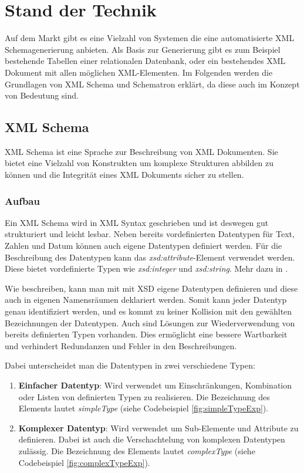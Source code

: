\chapter{Stand der Technik}
\label{cha:technikstand}
Auf dem Markt gibt es eine Vielzahl von Systemen die eine automatisierte XML Schemagenerierung anbieten.
Als Basis zur Generierung gibt es zum Beispiel bestehende Tabellen einer relationalen Datenbank, oder ein bestehendes XML Dokument mit allen möglichen XML-Elementen. Im Folgenden werden die Grundlagen von XML Schema und Schematron erklärt, da diese auch im Konzept von Bedeutung sind.

\section{XML Schema}
\label{cha:Schema}
XML Schema ist eine Sprache zur Beschreibung von XML Dokumenten. Sie bietet eine Vielzahl von Konstrukten um komplexe Strukturen abbilden zu können und die Integrität eines XML Dokuments sicher zu stellen.

\subsection{Aufbau}
Ein XML Schema wird in XML Syntax geschrieben und ist deswegen gut strukturiert und leicht lesbar.
Neben bereits vordefinierten Datentypen für Text, Zahlen und Datum können auch eigene Datentypen definiert werden. Für die Beschreibung des Datentypen kann das \emph{xsd:attribute}-Element verwendet werden. Diese bietet vordefinierte Typen wie \emph{xsd:integer} und \emph{xsd:string}. Mehr dazu in \textcite{Wheeler2011}.

Wie \textcite{Madhavan2001} beschreiben, kann man mit mit XSD eigene Datentypen definieren und diese auch in eigenen Namensräumen deklariert werden. Somit kann jeder Datentyp genau identifiziert werden, und es kommt zu keiner Kollision mit den gewählten Bezeichnungen der Datentypen.
Auch sind Lösungen zur Wiederverwendung von bereits definierten Typen vorhanden. Dies ermöglicht eine bessere Wartbarkeit und verhindert Redundanzen und Fehler in den Beschreibungen.

Dabei unterscheidet man die Datentypen in zwei verschiedene Typen:

\begin{enumerate}
\item \textbf{Einfacher Datentyp}: Wird verwendet um Einschränkungen, Kombination oder Listen von definierten Typen zu realisieren. Die Bezeichnung des Elements lautet \emph{simpleType} (siehe Codebeispiel \ref{fig:simpleTypeExp}).
\item \textbf{Komplexer Datentyp}: Wird verwendet um Sub-Elemente und Attribute zu definieren. Dabei ist auch die Verschachtelung von komplexen Datentypen zulässig. Die Bezeichnung des Elements lautet \emph{complexType} (siehe Codebeispiel \ref{fig:complexTypeExp}).
\end{enumerate}

